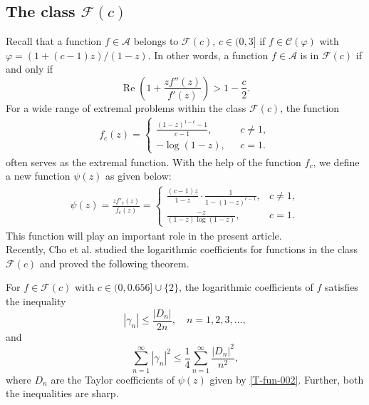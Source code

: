 \documentclass[a4paper,12pt]{amsart}
\theoremstyle{definition}
\newenvironment{customthm}[1]
  {\renewcommand\theinnercustomthm{#1}\innercustomthm}
  {\endinnercustomthm}
\newcounter {own}
\begin{document}
\subsection{The class   $\mathcal{F}(c)$}
Recall that a function $f\in\mathcal{A}$ belongs to $\mathcal{F}(c)$, $c\in(0,3]$ if  $f\in\mathcal{C}(\varphi)$ with $\varphi=(1+(c-1)z)/(1-z)$. In other words,  a function $f\in\mathcal{A}$ is in $\mathcal{F}(c)$ if and only if
\[
\operatorname{Re}\left(1 + \frac{zf''(z)}{f'(z)}\right) > 1 - \frac{c}{2}.
\]
For a wide range of extremal problems within the class $\mathcal{F}(c)$, the function 
\begin{align}\label{T-fun-001}
    f_c(z) = 
\begin{cases}
\displaystyle \frac{(1 - z)^{1-c} - 1}{c - 1}, &~~~c\neq1,\\
\displaystyle -\log(1-z), &~~~c=1.
\end{cases}
\end{align}
often serves as the extremal function. With the help of the function $f_c$, we define a new function $\psi(z)$ as given below:
\begin{align}\label{T-fun-002}
    \psi(z) = \frac{zf'_c(z)}{f_c(z)}=
\begin{cases}
   \displaystyle \frac{(c - 1)z}{1 - z} \cdot \frac{1}{1 - (1 - z)^{c-1}}, & c\neq1,\\[2mm]
   \displaystyle \frac{-z}{(1-z)\log(1-z)}, & c=1.
\end{cases}
\end{align}
This function will play an important role in the present article.\\


Recently, Cho et al. \cite{cho-Alimohammadi-2021} studied the logarithmic coefficients for functions in the class $\mathcal{F}(c)$ and proved the following theorem. 


\begin{customthm}{A}\cite[Theorem 2.1 ]{cho-Alimohammadi-2021}\label{T-thm-A}
For $f\in \mathcal{F}(c)$ with $c \in (0, 0.656] \cup \{2\}$, the logarithmic coefficients of $f$ satisfies the inequality
\begin{equation}\label{eq:main-inequality}
|\gamma_n| \leq \frac{|D_n|}{2n}, \quad n = 1, 2, 3, \dots,
\end{equation}
and
$$
\sum_{n=1}^{\infty} |\gamma_n|^2 \leq \frac{1}{4} \sum_{n=1}^{\infty} \frac{|D_n|^2}{ n^2},
$$
where $D_n$ are the Taylor coefficients of $\psi(z)$ given by \eqref{T-fun-002}. Further, both the inequalities are sharp.
\end{customthm}
\end{document}
